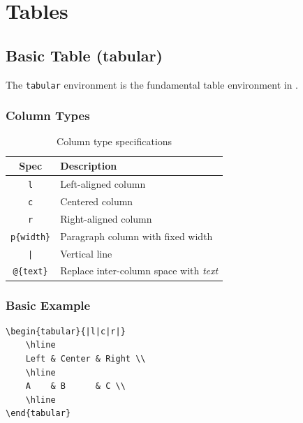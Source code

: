 
\chapter{Tables}

\section{Basic Table (tabular)}

The \texttt{tabular} environment is the fundamental table environment in \latex{}.

\subsection{Column Types}

\begin{table}[H]
\centering
\begin{tabular}{cl}
\toprule
\textbf{Spec} & \textbf{Description} \\
\midrule
\texttt{l} & Left-aligned column \\
\texttt{c} & Centered column \\
\texttt{r} & Right-aligned column \\
\texttt{p\{width\}} & Paragraph column with fixed width \\
\texttt{|} & Vertical line \\
\texttt{@\{text\}} & Replace inter-column space with \textit{text} \\
\bottomrule
\end{tabular}
\caption{Column type specifications}
\end{table}

\subsection{Basic Example}

\begin{lstlisting}[language={[LaTeX]TeX}, caption=Basic tabular]
\begin{tabular}{|l|c|r|}
    \hline
    Left & Center & Right \\
    \hline
    A    & B      & C \\
    \hline
\end{tabular}
\end{lstlisting}

